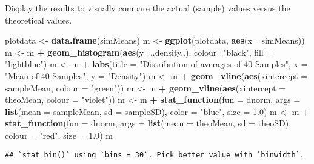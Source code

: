 \documentclass[]{article}
\newenvironment{Shaded}{\begin{snugshade}}{\end{snugshade}}
\newcommand{\KeywordTok}[1]{\textcolor[rgb]{0.13,0.29,0.53}{\textbf{#1}}}
\newcommand{\DataTypeTok}[1]{\textcolor[rgb]{0.13,0.29,0.53}{#1}}
\newcommand{\FloatTok}[1]{\textcolor[rgb]{0.00,0.00,0.81}{#1}}
\newcommand{\StringTok}[1]{\textcolor[rgb]{0.31,0.60,0.02}{#1}}
\newcommand{\OperatorTok}[1]{\textcolor[rgb]{0.81,0.36,0.00}{\textbf{#1}}}
\newcommand{\NormalTok}[1]{#1}
\begin{document}
Display the results to visually compare the actual (sample) values
versus the theoretical values.

\begin{Shaded}
\begin{Highlighting}[]
\NormalTok{plotdata <-}\StringTok{ }\KeywordTok{data.frame}\NormalTok{(simMeans)}
\NormalTok{m <-}\StringTok{ }\KeywordTok{ggplot}\NormalTok{(plotdata, }\KeywordTok{aes}\NormalTok{(}\DataTypeTok{x =}\NormalTok{simMeans))}
\NormalTok{m <-}\StringTok{ }\NormalTok{m }\OperatorTok{+}\StringTok{ }\KeywordTok{geom_histogram}\NormalTok{(}\KeywordTok{aes}\NormalTok{(}\DataTypeTok{y=}\NormalTok{..density..), }\DataTypeTok{colour=}\StringTok{"black"}\NormalTok{,}
                        \DataTypeTok{fill =} \StringTok{"lightblue"}\NormalTok{)}
\NormalTok{m <-}\StringTok{ }\NormalTok{m }\OperatorTok{+}\StringTok{ }\KeywordTok{labs}\NormalTok{(}\DataTypeTok{title =} \StringTok{"Distribution of averages of 40 Samples"}\NormalTok{, }\DataTypeTok{x =} \StringTok{"Mean of 40 Samples"}\NormalTok{, }\DataTypeTok{y =} \StringTok{"Density"}\NormalTok{)}
\NormalTok{m <-}\StringTok{ }\NormalTok{m }\OperatorTok{+}\StringTok{ }\KeywordTok{geom_vline}\NormalTok{(}\KeywordTok{aes}\NormalTok{(}\DataTypeTok{xintercept =}\NormalTok{ sampleMean, }\DataTypeTok{colour =} \StringTok{"green"}\NormalTok{))}
\NormalTok{m <-}\StringTok{ }\NormalTok{m }\OperatorTok{+}\StringTok{ }\KeywordTok{geom_vline}\NormalTok{(}\KeywordTok{aes}\NormalTok{(}\DataTypeTok{xintercept =}\NormalTok{ theoMean, }\DataTypeTok{colour =} \StringTok{"violet"}\NormalTok{))}
\NormalTok{m <-}\StringTok{ }\NormalTok{m }\OperatorTok{+}\StringTok{ }\KeywordTok{stat_function}\NormalTok{(}\DataTypeTok{fun =}\NormalTok{ dnorm, }\DataTypeTok{args =} \KeywordTok{list}\NormalTok{(}\DataTypeTok{mean =}\NormalTok{ sampleMean, }\DataTypeTok{sd =}\NormalTok{ sampleSD), }\DataTypeTok{color =} \StringTok{"blue"}\NormalTok{, }\DataTypeTok{size =} \FloatTok{1.0}\NormalTok{)}
\NormalTok{m <-}\StringTok{ }\NormalTok{m }\OperatorTok{+}\StringTok{ }\KeywordTok{stat_function}\NormalTok{(}\DataTypeTok{fun =}\NormalTok{ dnorm, }\DataTypeTok{args =} \KeywordTok{list}\NormalTok{(}\DataTypeTok{mean =}\NormalTok{ theoMean, }\DataTypeTok{sd =}\NormalTok{ theoSD), }\DataTypeTok{colour =} \StringTok{"red"}\NormalTok{, }\DataTypeTok{size =} \FloatTok{1.0}\NormalTok{)}
\NormalTok{m}
\end{Highlighting}
\end{Shaded}

\begin{verbatim}
## `stat_bin()` using `bins = 30`. Pick better value with `binwidth`.
\end{verbatim}
\end{document}
